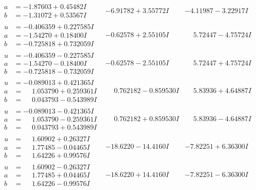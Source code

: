 \documentclass[1p]{elsarticle_modified}
\theoremstyle{definition}
\begin{document}
$$\begin{array}{c|c|c}
\begin{aligned}
a &= -1.87603 + 0.45482 I \\
b &= -1.31072 + 0.53567 I\end{aligned}
 & -6.91782 + 3.55772 I & -4.11987 - 3.22917 I \\ \hline\begin{aligned}
u &= -0.406359 + 0.227585 I \\
a &= -1.54270 + 0.18400 I \\
b &= -0.725818 + 0.732059 I\end{aligned}
 & -0.62578 + 2.55105 I & \phantom{-}5.72447 - 4.75724 I \\ \hline\begin{aligned}
u &= -0.406359 - 0.227585 I \\
a &= -1.54270 - 0.18400 I \\
b &= -0.725818 - 0.732059 I\end{aligned}
 & -0.62578 - 2.55105 I & \phantom{-}5.72447 + 4.75724 I \\ \hline\begin{aligned}
u &= -0.089013 + 0.421365 I \\
a &= \phantom{-}1.053790 + 0.259361 I \\
b &= \phantom{-}0.043793 - 0.543989 I\end{aligned}
 & \phantom{-}0.762182 - 0.859530 I & \phantom{-}5.83936 + 4.64887 I \\ \hline\begin{aligned}
u &= -0.089013 - 0.421365 I \\
a &= \phantom{-}1.053790 - 0.259361 I \\
b &= \phantom{-}0.043793 + 0.543989 I\end{aligned}
 & \phantom{-}0.762182 + 0.859530 I & \phantom{-}5.83936 - 4.64887 I \\ \hline\begin{aligned}
u &= \phantom{-}1.60902 + 0.26327 I \\
a &= \phantom{-}1.77485 - 0.04465 I \\
b &= \phantom{-}1.64226 + 0.99576 I\end{aligned}
 & -18.6220 - 14.4160 I & -7.82251 + 6.36300 I \\ \hline\begin{aligned}
u &= \phantom{-}1.60902 - 0.26327 I \\
a &= \phantom{-}1.77485 + 0.04465 I \\
b &= \phantom{-}1.64226 - 0.99576 I\end{aligned}
 & -18.6220 + 14.4160 I & -7.82251 - 6.36300 I \\ \hline\begin{aligned}

\end{aligned}
\end{array}$$
\end{document}
